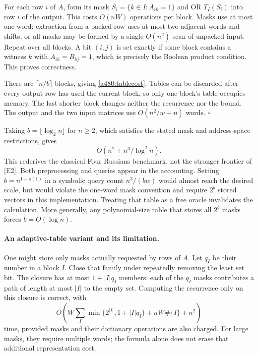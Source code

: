 \documentclass[11pt]{article}
\begin{document}
For each row $i$ of $A$, form its mask
$S_i=\{k\in I:A_{ik}=1\}$ and OR $T_I(S_i)$ into row $i$ of the
output. This costs $O(nW)$ operations per block. Masks use at most one
word; extraction from a packed row uses at most two adjacent words and
shifts, or all masks may be formed by a single $O(n^2)$ scan of unpacked
input. Repeat over all blocks. A bit $(i,j)$ is set exactly if some
block contains a witness $k$ with $A_{ik}=B_{kj}=1$, which is precisely
the Boolean product condition. This proves correctness.

There are $\lceil n/b\rceil$ blocks, giving
\eqref{a480:tablecost}. Tables can be discarded after every output row
has used the current block, so only one block's table occupies memory.
The last shorter block changes neither the recurrence nor the bound.
The output and the two input matrices use $O(n^2/w+n)$ words.
\hfill$\square$

Taking $b=\lfloor\log_2 n\rfloor$ for $n\geq2$, which satisfies
the stated mask and address-space restrictions, gives
\begin{equation}\label{a480:fourrussians}
                        O(n^2+n^3/\log^2 n).
\end{equation}
This rederives the classical Four Russians benchmark, not the stronger
frontier of [E2]. Both preprocessing and queries appear in the accounting.
Setting $b=n^{1-o(1)}$ in a symbolic query count
$n^3/(bw)$ would almost reach the desired scale, but would violate the
one-word mask convention and require $2^b$ stored vectors in this
implementation. Treating that table as a free oracle invalidates the
calculation. More generally, any polynomial-size table that stores all
$2^b$ masks forces $b=O(\log n)$.

\paragraph{An adaptive-table variant and its limitation.}
One might store only masks actually requested by rows of $A$. Let $q_I$
be their number in a block $I$. Close that family under repeatedly removing
the least set bit. The closure has at most $1+|I|q_I$ members: each of
the $q_I$ masks contributes a path of length at most $|I|$ to the empty
set. Computing the recurrence only on this closure is correct, with
\[
 O\left(W\sum_I\min\{2^{|I|},1+|I|q_I\}+nW\#\{I\}+n^2\right)
\]
time, provided masks and their dictionary operations are also charged.
For large masks, they require multiple words; the formula alone does not
erase that additional representation cost.
\end{document}
